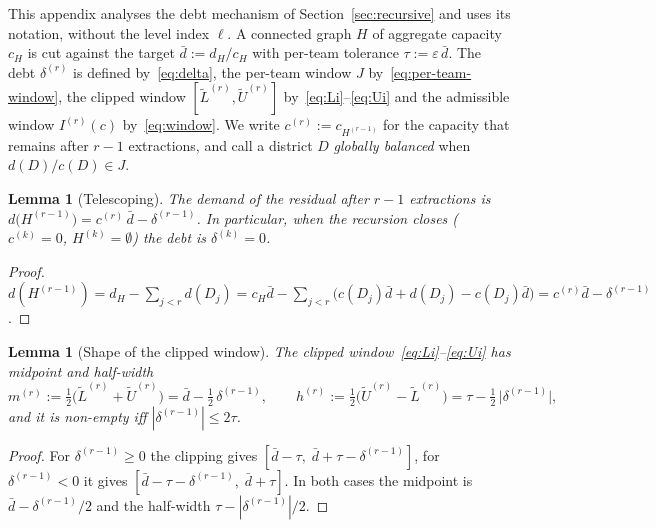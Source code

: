 \documentclass[11pt]{article}
\newtheorem{lemma}[theorem]{Lemma}
\theoremstyle{definition}
\begin{document}
This appendix analyses the debt mechanism of Section~\ref{sec:recursive} and uses its notation, without the level index $\ell$. A connected graph $H$ of aggregate capacity $c_H$ is cut against the target $\bar d := d_H/c_H$ with per-team tolerance $\tau := \varepsilon\,\bar d$. The debt $\delta^{(r)}$ is defined by~\eqref{eq:delta}, the per-team window $J$ by~\eqref{eq:per-team-window}, the clipped window $[\widetilde L^{(r)},\widetilde U^{(r)}]$ by~\eqref{eq:Li}--\eqref{eq:Ui} and the admissible window $I^{(r)}(c)$ by~\eqref{eq:window}. We write $c^{(r)} := c_{H^{(r-1)}}$ for the capacity that remains after $r-1$ extractions, and call a district $D$ \emph{globally balanced} when $d(D)/c(D) \in J$.

\begin{lemma}[Telescoping]\label{lem:app-telescoping}\label{rem:telescoping}
The demand of the residual after $r-1$ extractions is
$d\bigl(H^{(r-1)}\bigr) = c^{(r)}\,\bar d-\delta^{(r-1)}$. In particular,
when the recursion closes ($c^{(k)}=0$, $H^{(k)}=\emptyset$) the debt is
$\delta^{(k)}=0$.
\end{lemma}
\begin{proof}
$d(H^{(r-1)}) = d_H-\sum_{j<r} d(D_j)
 = c_H\bar d-\sum_{j<r}\bigl(c(D_j)\bar d + d(D_j)-c(D_j)\bar d\bigr)
 = c^{(r)}\bar d-\delta^{(r-1)}$.
\end{proof}

\begin{lemma}[Shape of the clipped window]\label{lem:app-shape}\label{cor:feas-condition}\label{cor:debt-consequences}
The clipped window~\eqref{eq:Li}--\eqref{eq:Ui} has midpoint and half-width
\begin{equation}\label{eq:app-mh}
  m^{(r)} := \tfrac12\bigl(\widetilde L^{(r)}+\widetilde U^{(r)}\bigr)
           = \bar d-\tfrac12\,\delta^{(r-1)},\qquad
  h^{(r)} := \tfrac12\bigl(\widetilde U^{(r)}-\widetilde L^{(r)}\bigr)
           = \tau-\tfrac12\,\bigl|\delta^{(r-1)}\bigr|,
\end{equation}
and it is non-empty iff $|\delta^{(r-1)}|\le 2\tau$.
\end{lemma}
\begin{proof}
For $\delta^{(r-1)}\ge 0$ the clipping gives
$[\bar d-\tau,\;\bar d+\tau-\delta^{(r-1)}]$, for $\delta^{(r-1)}<0$ it gives $[\bar d-\tau-\delta^{(r-1)},\;\bar d+\tau]$. In both cases the midpoint is
$\bar d-\delta^{(r-1)}/2$ and the half-width $\tau-|\delta^{(r-1)}|/2$.
\end{proof}
\end{document}
